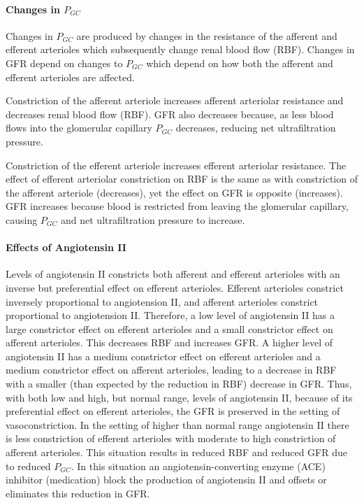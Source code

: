 \paragraph{Changes in $P_{GC}$}

Changes in $P_{GC}$ are produced by changes in the resistance of the afferent and efferent arterioles which subsequently change renal blood flow (RBF). Changes in GFR depend on changes to $P_{GC}$ which depend on how both the afferent and efferent arterioles are affected.

Constriction of the afferent arteriole increases afferent arteriolar resistance and decreases renal blood flow (RBF). GFR also decreases because, as less blood flows into the glomerular capillary $P_{GC}$ decreases, reducing net ultrafiltration pressure.

Constriction of the efferent arteriole increases efferent arteriolar resistance. The effect of efferent arteriolar constriction on RBF is the same as with constriction of the afferent arteriole (decreases), yet the effect on GFR is opposite (increases). GFR increases because blood is restricted from leaving the glomerular capillary, causing $P_{GC}$ and net ultrafiltration pressure to increase.

\paragraph{Effects of Angiotensin II}

Levels of angiotensin II constricts both afferent and efferent arterioles with an inverse but preferential effect on efferent arterioles. Efferent arterioles constrict inversely proportional to angiotension II, and afferent arterioles constrict proportional to angiotension II. Therefore, a low level of angiotensin II has a large constrictor effect on efferent arterioles and a small constrictor effect on afferent arterioles. This decreases RBF and increases GFR. A higher level of angiotensin II has a medium constrictor effect on efferent arterioles and a medium constrictor effect on afferent arterioles, leading to a decrease in RBF with a smaller (than expected by the reduction in RBF) decrease in GFR. Thus, with both low and high, but normal range, levels of angiotensin II, because of its preferential effect on efferent arterioles, the GFR is preserved in the setting of vasoconstriction. In the setting of higher than normal range angiotensin II there is less constriction of efferent arterioles with moderate to high constriction of afferent arterioles. This situation results in reduced RBF and reduced GFR due to reduced  $P_{GC}$. In this situation an angiotensin-converting enzyme (ACE) inhibitor (medication) block the production of angiotensin II and offsets or eliminates this reduction in GFR.

